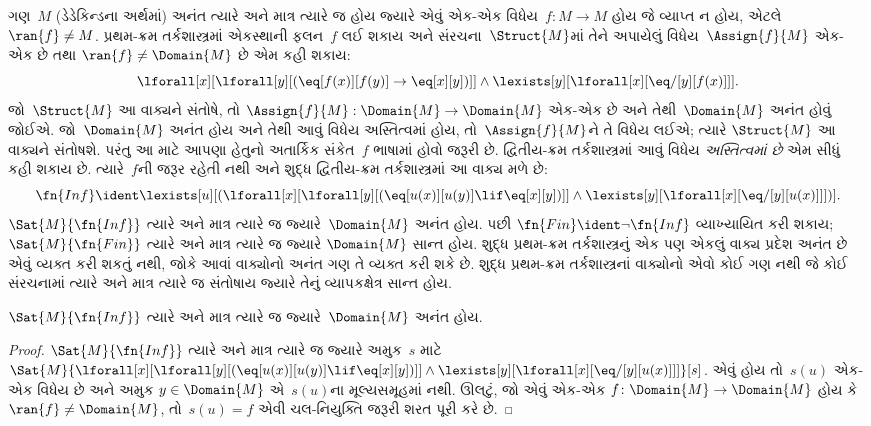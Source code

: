 \begingroup
\makeatletter{}\makeatother


\label{guunit:OLP-0329}


ગણ~$M$ (ડેડેકિન્ડના અર્થમાં) અનંત ત્યારે અને માત્ર ત્યારે જ હોય જ્યારે
એવું એક-એક વિધેય~$f\colon M
\to M$ હોય જે વ્યાપ્ત ન હોય, એટલે $\ran{f} \neq M$. પ્રથમ-ક્રમ
તર્કશાસ્ત્રમાં એકસ્થાની ફલન~$f$ લઈ શકાય અને
સંરચના~$\Struct{M}$માં તેને અપાયેલું વિધેય~$\Assign{f}{M}$
એક-એક છે તથા $\ran{f} \neq
\Domain{M}$ છે એમ કહી શકાય:
\[
\lforall[x][\lforall[y][(\eq[f(x)][f(y)] \to \eq[x][y])]] \land
\lexists[y][\lforall[x][\eq/[y][f(x)]]].
\]
જો~$\Struct{M}$ આ વાક્યને સંતોષે, તો
$\Assign{f}{M}:
\Domain{M} \to \Domain{M}$ એક-એક છે અને તેથી~$\Domain{M}$
અનંત હોવું જોઈએ. જો~$\Domain{M}$ અનંત હોય અને તેથી આવું વિધેય
અસ્તિત્વમાં હોય, તો~$\Assign{f}{M}$ને તે વિધેય લઈએ; ત્યારે
$\Struct{M}$ આ વાક્યને સંતોષશે. પરંતુ આ માટે આપણા હેતુનો
અતાર્કિક સંકેત~$f$ ભાષામાં હોવો જરૂરી છે. દ્વિતીય-ક્રમ તર્કશાસ્ત્રમાં
આવું વિધેય \emph{અસ્તિત્વમાં છે} એમ સીધું કહી શકાય છે. ત્યારે~$f$ની
જરૂર રહેતી નથી અને શુદ્ધ દ્વિતીય-ક્રમ તર્કશાસ્ત્રમાં આ વાક્ય
મળે છે:
\[
\fn{Inf} \ident \lexists[u][(\lforall[x][\lforall[y][(\eq[u(x)][u(y)]
      \lif \eq[x][y])]] \land \lexists[y][\lforall[x][\eq/[y][u(x)]]])].
\]
$\Sat{M}{\fn{Inf}}$ ત્યારે અને માત્ર ત્યારે જ જ્યારે~$\Domain{M}$
અનંત હોય. પછી $\fn{Fin} \ident \lnot \fn{Inf}$ વ્યાખ્યાયિત કરી
શકાય; $\Sat{M}{\fn{Fin}}$ ત્યારે અને માત્ર ત્યારે જ જ્યારે
$\Domain{M}$ સાન્ત હોય. શુદ્ધ પ્રથમ-ક્રમ તર્કશાસ્ત્રનું એક પણ એકલું
વાક્ય પ્રદેશ અનંત છે એવું વ્યક્ત કરી શકતું નથી, જોકે
આવાં વાક્યોનો અનંત ગણ તે વ્યક્ત કરી શકે છે. શુદ્ધ પ્રથમ-ક્રમ
તર્કશાસ્ત્રનાં વાક્યોનો એવો કોઈ ગણ નથી જે કોઈ
સંરચનામાં ત્યારે અને માત્ર ત્યારે જ સંતોષાય જ્યારે તેનું
વ્યાપકક્ષેત્ર સાન્ત હોય.

\begin{prop}
$\Sat{M}{\fn{Inf}}$ ત્યારે અને માત્ર ત્યારે જ જ્યારે~$\Domain{M}$
અનંત હોય.
\end{prop}

\begin{proof}
$\Sat{M}{\fn{Inf}}$ ત્યારે અને માત્ર ત્યારે જ જ્યારે અમુક~$s$
માટે
  $\Sat{M}{\lforall[x][\lforall[y][(\eq[u(x)][u(y)] \lif \eq[x][y])]]
    \land \lexists[y][\lforall[x][\eq/[y][u(x)]]]}[s]$.
  એવું હોય તો~$s(u)$ એક-એક વિધેય છે અને અમુક $y
  \in \Domain{M}$ એ~$s(u)$ના મૂલ્યસમૂહમાં નથી. ઊલટું, જો એવું
  એક-એક $f\colon \Domain{M} \to \Domain{M}$ હોય કે
  $\ran{f} \neq \Domain{M}$, તો~$s(u) = f$ એવી ચલ-નિયુક્તિ જરૂરી
  શરત પૂરી કરે છે.
\end{proof}

